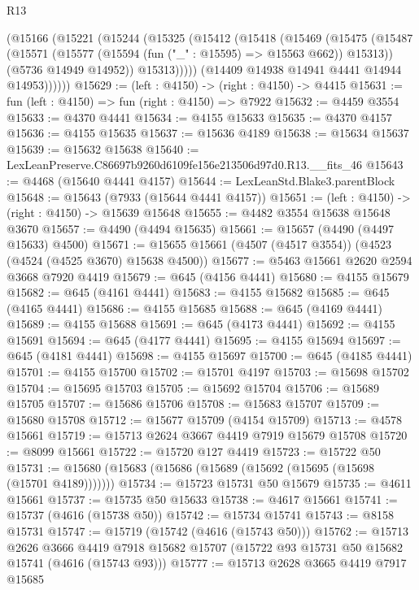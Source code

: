 \begin{lexlean}{R13}
\begin{coremodule}
        (@15166
          (@15221
            (@15244
              (@15325
                (@15412
                  (@15418
                    (@15469
                      (@15475
                        (@15487
                          (@15571 (@15577 (@15594 (fun ("_" : @15595) => @15563 @662)) @15313))
                          (@5736 @14949 @14952))
                        @15313)))))
              (@14409 @14938 @14941 @4441 @14944 @14953))))))
@15629 := (left : @4150) -> (right : @4150) -> @4415
@15631 := fun (left : @4150) => fun (right : @4150) => @7922
@15632 := @4459 @3554
@15633 := @4370 @4441
@15634 := @4155 @15633
@15635 := @4370 @4157
@15636 := @4155 @15635
@15637 := @15636 @4189
@15638 := @15634 @15637
@15639 := @15632 @15638
@15640 := LexLeanPreserve.C86697b9260d6109fe156e213506d97d0.R13.__fits_46
@15643 := @4468 (@15640 @4441 @4157)
@15644 := LexLeanStd.Blake3.parentBlock
@15648 := @15643 (@7933 (@15644 @4441 @4157))
@15651 := (left : @4150) -> (right : @4150) -> @15639 @15648
@15655 := @4482 @3554 @15638 @15648 @3670
@15657 := @4490 (@4494 @15635)
@15661 := @15657 (@4490 (@4497 @15633) @4500)
@15671 := @15655 @15661 (@4507 (@4517 @3554)) (@4523 (@4524 (@4525 @3670) @15638 @4500))
@15677 := @5463 @15661 @2620 @2594 @3668 @7920 @4419
@15679 := @645 (@4156 @4441)
@15680 := @4155 @15679
@15682 := @645 (@4161 @4441)
@15683 := @4155 @15682
@15685 := @645 (@4165 @4441)
@15686 := @4155 @15685
@15688 := @645 (@4169 @4441)
@15689 := @4155 @15688
@15691 := @645 (@4173 @4441)
@15692 := @4155 @15691
@15694 := @645 (@4177 @4441)
@15695 := @4155 @15694
@15697 := @645 (@4181 @4441)
@15698 := @4155 @15697
@15700 := @645 (@4185 @4441)
@15701 := @4155 @15700
@15702 := @15701 @4197
@15703 := @15698 @15702
@15704 := @15695 @15703
@15705 := @15692 @15704
@15706 := @15689 @15705
@15707 := @15686 @15706
@15708 := @15683 @15707
@15709 := @15680 @15708
@15712 := @15677 @15709 (@4154 @15709)
@15713 := @4578 @15661
@15719 := @15713 @2624 @3667 @4419 @7919 @15679 @15708
@15720 := @8099 @15661
@15722 := @15720 @127 @4419
@15723 := @15722 @50
@15731 := @15680 (@15683 (@15686 (@15689 (@15692 (@15695 (@15698 (@15701 @4189)))))))
@15734 := @15723 @15731 @50 @15679
@15735 := @4611 @15661
@15737 := @15735 @50 @15633
@15738 := @4617 @15661
@15741 := @15737 (@4616 (@15738 @50))
@15742 := @15734 @15741
@15743 := @8158 @15731
@15747 := @15719 (@15742 (@4616 (@15743 @50)))
@15762 := @15713
    @2626
    @3666
    @4419
    @7918
    @15682
    @15707
    (@15722 @93 @15731 @50 @15682 @15741 (@4616 (@15743 @93)))
@15777 := @15713
    @2628
    @3665
    @4419
    @7917
    @15685

\end{coremodule}
\end{lexlean}
